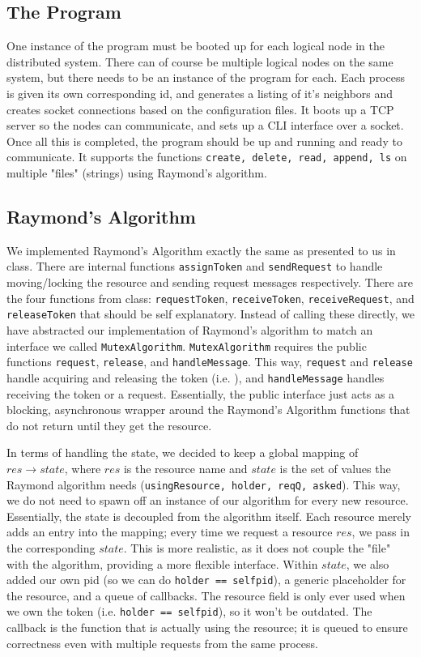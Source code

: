 \documentclass{article}
\begin{document}
\subsection*{The Program}
One instance of the program must be booted up for each logical node in the distributed system. There can of course be multiple logical nodes on the same system, but there needs to be an instance of the program for each. Each process is given its own corresponding id, and generates a listing of it's neighbors and creates socket connections based on the configuration files. It boots up a TCP server so the nodes can communicate, and sets up a CLI interface over a socket. Once all this is completed, the program should be up and running and ready to communicate. It supports the functions \texttt{create, delete, read, append, ls} on multiple "files" (strings) using Raymond's algorithm.
 
\subsection*{Raymond's Algorithm}
We implemented Raymond's Algorithm exactly the same as presented to us in class. There are internal functions \texttt{assignToken} and \texttt{sendRequest} to handle moving/locking the resource and sending request messages respectively. There are the four functions from class: \texttt{requestToken}, \texttt{receiveToken}, \texttt{receiveRequest}, and \texttt{releaseToken} that should be self explanatory. Instead of calling these directly, we have abstracted our implementation  of Raymond's algorithm to match an interface we called \texttt{MutexAlgorithm}. \texttt{MutexAlgorithm} requires the public functions \texttt{request}, \texttt{release}, and \texttt{handleMessage}. This way, \texttt{request} and \texttt{release} handle acquiring and releasing the token (i.e. ), and \texttt{handleMessage} handles receiving the token or a request. Essentially, the public interface just acts as a blocking, asynchronous wrapper around the Raymond's Algorithm functions that do not return until they get the resource.

In terms of handling the state, we decided to keep a global mapping of $res \to state$, where $res$ is the resource name and $state$ is the set of values the Raymond algorithm needs (\texttt{usingResource, holder, reqQ, asked}). This way, we do not need to spawn off an instance of our algorithm for every new resource. Essentially, the state is decoupled from the algorithm itself. Each resource merely adds an entry into the mapping; every time we request a resource $res$, we pass in the corresponding $state$. This is more realistic, as it does not couple the "file" with the algorithm, providing a more flexible interface. Within $state$, we also added our own pid (so we can do \texttt{holder == selfpid}), a generic placeholder for the resource, and a queue of callbacks. The resource field is only ever used when we own the token (i.e. \texttt{holder == selfpid}), so it won't be outdated. The callback is the function that is actually using the resource; it is queued to ensure correctness even with multiple requests from the same process.
\end{document}
